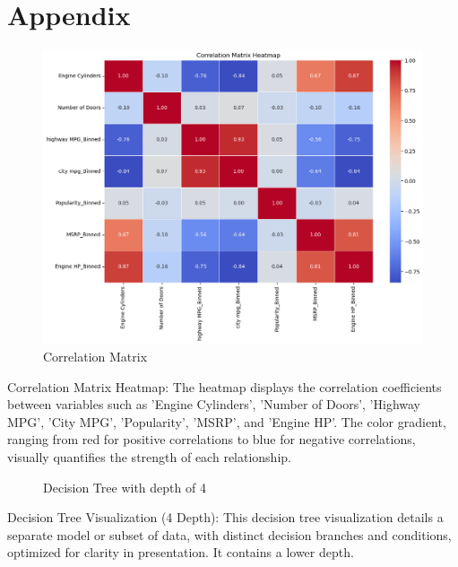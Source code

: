 \documentclass{article}
\begin{document}
\section{Appendix}
\begin{figure}[h]
\caption{Correlation Matrix}
\includegraphics[scale=0.5]{CorrelationMatrix.png}\newline
\end{figure}

Correlation Matrix Heatmap: The heatmap displays the correlation coefficients between variables such as 'Engine Cylinders', 'Number of Doors', 'Highway MPG', 'City MPG', 'Popularity', 'MSRP', and 'Engine HP'. The color gradient, ranging from red for positive correlations to blue for negative correlations, visually quantifies the strength of each relationship.

\begin{figure}[h]
\caption{Decision Tree with depth of 4}
\end{figure}
Decision Tree Visualization (4 Depth): This decision tree visualization details a separate model or subset of data, with distinct decision branches and conditions, optimized for clarity in presentation. It contains a lower depth. 
\end{document}
